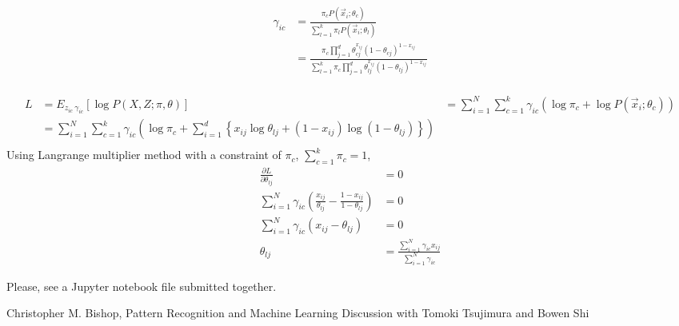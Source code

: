 \documentclass{introtosml}
\newcommand{\x}{\vec{x}}
\newcommand\pinb[1]{\pi_c \prod_{j=1}^d \theta_{#1 j}^{x_{ij}} (1 - \theta_{#1 j})^{1 - x_{ij}}}
\begin{document}
\begin{p}
  \item
    \begin{align*}
      \gamma_{ic}
      & = \frac{\pi_c P(\x_i; \theta_c)}{\sum_{l=1}^k \pi_l P(\x_i; \theta_l)} \\
      & = \frac{\pinb{c}}{\sum_{l=1}^k \pinb{l}} \\
    \end{align*}

  \item
    \begin{align*}
      L
      & = E_{z_{ic} ~ \gamma_{ic}} \left[ \log P(X, Z; \pi, \theta) \right]
      & = \sum_{i=1}^N \sum_{c=1}^k \gamma_{ic} (\log \pi_c + \log P(\x_i; \theta_c)) \\
      & = \sum_{i=1}^N \sum_{c=1}^k \gamma_{ic} (\log \pi_c + \sum_{i=1}^d
          \left\{ x_{ij} \log \theta_{lj} + (1 - x_{ij}) \log (1 - \theta_{lj}) \right\}) \\
    \end{align*}
    Using Langrange multiplier method with a constraint of $\pi_c$, $\sum_{c=1}^k \pi_c = 1$,
    \begin{align*}
      \frac{\partial L}{\partial \theta_{lj}} & = 0 \\
      \sum_{i=1}^N \gamma_{ic} (\frac{x_{ij}}{\theta_{lj}} - \frac{1 - x_{ij}}{1 - \theta_{lj}}) & = 0 \\
      \sum_{i=1}^N \gamma_{ic} (x_{ij} - \theta_{lj}) & = 0 \\
      \theta_{lj} & = \frac{\sum_{i=1}^N \gamma_{ic} x_{ij}}{\sum_{i=1}^N \gamma_{ic}}
    \end{align*}

  \item
    Please, see a Jupyter notebook file submitted together.
\end{p}

\begin{thebibliography}{9}
   Christopher M. Bishop, Pattern Recognition and Machine Learning
   Discussion with Tomoki Tsujimura and Bowen Shi
\end{thebibliography}
\end{document}
